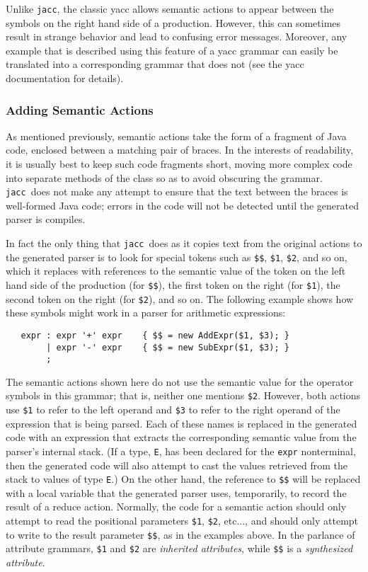 \documentclass[12pt]{article}
\def\jacc{{\tt jacc}}
\begin{document}
Unlike \jacc, the classic yacc allows semantic actions to appear
between the symbols on the right hand side of a production.
However, this can sometimes result in strange behavior and lead
to confusing error messages.  Moreover, any example that is
described using this feature of a yacc grammar can easily be
translated into a corresponding grammar that does not (see the
yacc documentation for details).

\subsubsection{Adding Semantic Actions}
As mentioned previously, semantic actions take the form of a
fragment of Java code, enclosed between a matching pair of
braces.  In the interests of
readability, it is usually best to keep such code fragments
short, moving more complex code into separate methods of
the class so as to avoid obscuring the grammar.  \jacc\ does
not make any attempt to ensure that the text between the
braces is well-formed Java code; errors in the code will
not be detected until the generated parser is compiles.

In fact the only thing that \jacc\ does as it copies text
from the original actions to the generated parser is to
look for special tokens such as \verb"$$", \verb"$1",
\verb"$2", and so on, which it replaces with references
to the semantic value of the token on the left hand side
of the production (for \verb"$$"), the first token on the
right (for \verb"$1"), the second token on the right
(for \verb"$2"), and so on.  The following example shows
how these symbols might work in a parser for
arithmetic expressions:
\begin{verbatim}
   expr : expr '+' expr    { $$ = new AddExpr($1, $3); }
        | expr '-' expr    { $$ = new SubExpr($1, $3); }
        ;
\end{verbatim}
The semantic actions shown here do not use the semantic
value for the operator symbols in this grammar; that is,
neither one mentions \verb"$2".  However, both actions
use \verb"$1" to refer to the left operand and \verb"$3"
to refer to the right operand of the expression that is
being parsed.  Each of these names is replaced in the
generated code with an expression that extracts the
corresponding semantic value from the parser's internal
stack.  (If a type, \verb"E", has been declared for the
\verb"expr" nonterminal, then the generated code will
also attempt to cast the values retrieved from the stack
to values of type \verb"E".)  On the other hand, the
reference to \verb"$$" will be replaced with a local
variable that the generated parser uses, temporarily,
to record the result of a reduce action.  Normally, the code
for a semantic action should only attempt to read the
positional parameters \verb"$1", \verb"$2", etc..., and
should only attempt to write to the result parameter \verb"$$",
as in the examples above.  In the parlance of attribute
grammars, \verb"$1" and \verb"$2" are {\em inherited attributes},
while \verb"$$" is a {\em synthesized attribute}.
\end{document}
